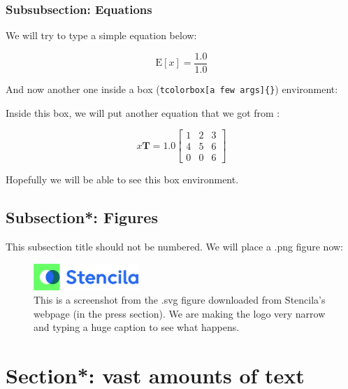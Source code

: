 \documentclass[oneside]{article}
\begin{document}
\subsubsection{Subsubsection: Equations}

We will try to type a simple equation below:

\begin{equation}
  \text{E}[x] = \frac{1.0}{1.0}
  \label{eq:eq1}
\end{equation}

And now another one inside a box (\texttt{tcolorbox[a few
  args]\{\}}) environment:

\begin{tcolorbox}[breakable, width=\textwidth, colback=gray!10, boxrule=0pt,
  title=Box 1: A box title fonttitle=\bfseries]
  \small

  Inside this box, we will put another equation that we got from
  \citealt{article2}:

  \begin{equation}
    x\mathbf{T} = 1.0
    \begin{bmatrix}
      1 & 2 & 3\\
      4 & 5 & 6\\
      0 & 0 & 6
    \end{bmatrix}
    \label{eq:eq2}
  \end{equation}

  Hopefully we will be able to see this box environment.
\end{tcolorbox}

\subsection*{Subsection*: Figures}

This subsection title should not be numbered.
We will place a .png figure now:

\begin{figure}[ht!]
  \includegraphics[width=4cm]{stencilaLogoPng.png}
  \caption{This is a screenshot from the .svg figure
    downloaded from Stencila's webpage (in the press
    section).
  We are making the logo very narrow and typing a huge
  caption to see what happens.}
  \label{fig:pnglogo}
\end{figure}


\section*{Section*: vast amounts of text}

\blindtext[4]


\end{document}
